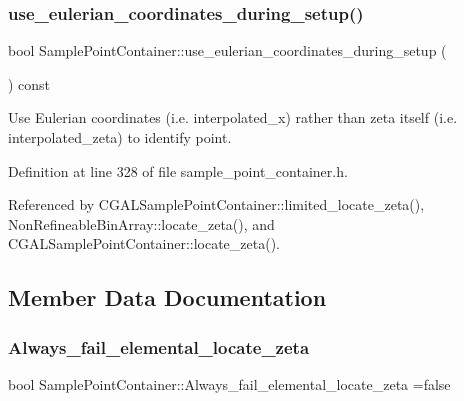 \subsubsection{\texorpdfstring{use\+\_\+eulerian\+\_\+coordinates\+\_\+during\+\_\+setup()}{use\_eulerian\_coordinates\_during\_setup()}}
{\footnotesize\ttfamily bool Sample\+Point\+Container\+::use\+\_\+eulerian\+\_\+coordinates\+\_\+during\+\_\+setup (\begin{DoxyParamCaption}{ }\end{DoxyParamCaption}) const\hspace{0.3cm}{\ttfamily [inline]}}



Use Eulerian coordinates (i.\+e. interpolated\+\_\+x) rather than zeta itself (i.\+e. interpolated\+\_\+zeta) to identify point. 



Definition at line 328 of file sample\+\_\+point\+\_\+container.\+h.



Referenced by C\+G\+A\+L\+Sample\+Point\+Container\+::limited\+\_\+locate\+\_\+zeta(), Non\+Refineable\+Bin\+Array\+::locate\+\_\+zeta(), and C\+G\+A\+L\+Sample\+Point\+Container\+::locate\+\_\+zeta().



\subsection{Member Data Documentation}
\mbox{\label{classSamplePointContainer_a1098cdf602fabc6ceec41bb7ea73805f}} 
\subsubsection{\texorpdfstring{Always\+\_\+fail\+\_\+elemental\+\_\+locate\+\_\+zeta}{Always\_fail\_elemental\_locate\_zeta}}
{\footnotesize\ttfamily bool Sample\+Point\+Container\+::\+Always\+\_\+fail\+\_\+elemental\+\_\+locate\+\_\+zeta =false\hspace{0.3cm}{\ttfamily [static]}}



